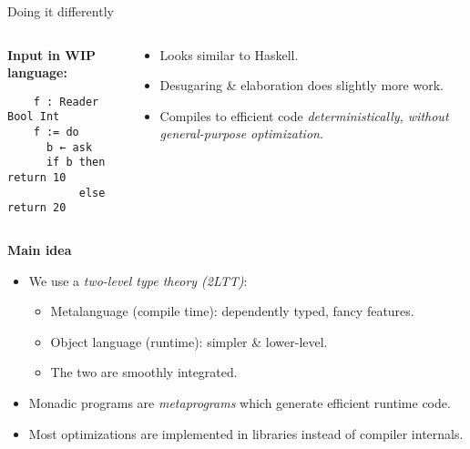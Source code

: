 \documentclass[dvipsnames,aspectratio=169]{beamer}
\theoremstyle{remark}
\begin{document}
\begin{frame}[fragile]{Doing it differently}

\begin{columns}
\begin{column}{0.3\textwidth}
\textbf{Input in WIP language:}
\begin{verbatim}
    f : Reader Bool Int
    f := do
      b ← ask
      if b then return 10
           else return 20
\end{verbatim}

\end{column}
\begin{column}{0.6\textwidth}
\begin{itemize}
\item Looks similar to Haskell.
\item Desugaring \& elaboration does slightly more work.
\item Compiles to efficient code \emph{deterministically, without
      general-purpose optimization}.
\end{itemize}
\end{column}
\end{columns}
\vspace{1em}
\pause

\begin{block}{}
\textbf{Main idea}
\begin{itemize}
\item We use a \emph{two-level type theory (2LTT)}:
  \begin{itemize}
    \item Metalanguage (compile time): dependently typed, fancy features.
    \item Object language (runtime): simpler \& lower-level.
    \item The two are smoothly integrated.
  \end{itemize}
\item Monadic programs are \emph{metaprograms} which generate efficient
  runtime code.
\item Most optimizations are implemented in libraries instead of compiler internals.
\end{itemize}
\end{block}

\end{frame}
\end{document}
